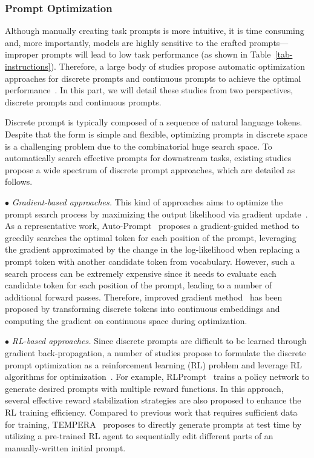 \subsubsection{Prompt Optimization} \label{sec:prompt_opt} 
{Although manually creating task prompts is more intuitive, it is time consuming and, more importantly, models are highly sensitive to the crafted prompts---improper prompts will lead to low task performance (as shown in Table~\ref{tab-instructions}). Therefore, a large body of studies propose automatic optimization approaches for discrete prompts and continuous prompts to achieve the optimal performance~\cite{shin-EMNLP-2020-autoprompt,Li-ACL-2021-prefix}. In this part, we will detail these studies from two perspectives, \ie discrete prompts and continuous prompts.}

  {Discrete prompt is typically composed of a sequence of natural language tokens. Despite that the form is simple and flexible, optimizing prompts in discrete space is a challenging problem due to the combinatorial huge search space. To automatically search effective prompts for downstream tasks, existing studies propose a wide spectrum of discrete prompt approaches, which are detailed as follows.}

$\bullet$  {\textit{Gradient-based approaches.} This kind of approaches aims to optimize the prompt search process by maximizing the output likelihood via gradient update~\cite{shin-EMNLP-2020-autoprompt,Wen-CoRR-2023-Hard,Gao-ACL-2021-Making,Zhou-CoRR-2023-InstructZero}.
As a representative work, Auto-Prompt~\cite{shin-EMNLP-2020-autoprompt} proposes a gradient-guided  method to greedily searches the optimal token for each position of the prompt,  leveraging the gradient approximated by the change in the log-likelihood when replacing a prompt token with another candidate token from vocabulary. However, such a search process can be extremely expensive since it needs to evaluate each candidate token for each position of the prompt, leading to a number of additional forward passes. Therefore, improved gradient method~\cite{Wen-CoRR-2023-Hard} has been proposed by transforming discrete tokens into continuous embeddings and computing the gradient on continuous space during  optimization.}

$\bullet$ {\textit{RL-based approaches.} 
Since discrete prompts are difficult to be learned through gradient back-propagation, a number of studies propose to formulate the discrete prompt optimization as a reinforcement learning (RL) problem and leverage RL algorithms for optimization~\cite{Deng-EMNLP-2022-RLPrompt,Zhang-ICLR-2023-TEMPERA}. For example, RLPrompt~\cite{Deng-EMNLP-2022-RLPrompt} {trains a policy network to generate desired prompts with multiple reward functions}. In this approach, several effective reward stabilization strategies are also proposed to enhance the RL training efficiency.  Compared to previous work that requires sufficient data for training, TEMPERA~\cite{Zhang-ICLR-2023-TEMPERA} proposes to directly generate prompts at test time {by utilizing a pre-trained RL agent to sequentially edit different parts of an manually-written initial prompt. 
}}

